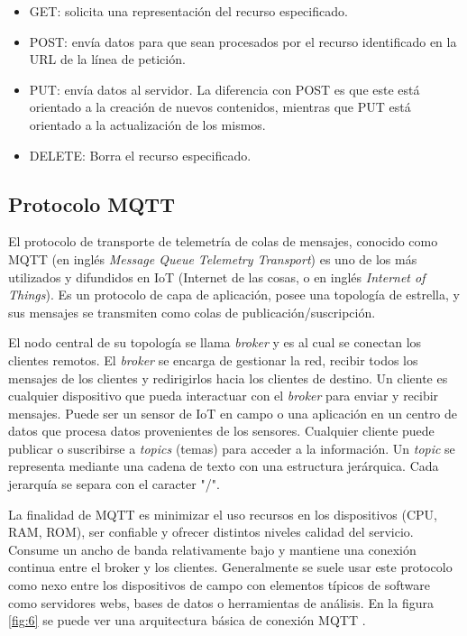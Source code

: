 \begin{itemize}
	\item GET: solicita una representación del recurso especificado.
	\item POST: envía datos para que sean procesados por el recurso identificado en la URL de la línea de petición.
	\item PUT: envía datos al servidor. La diferencia con POST es que este está orientado a la creación de nuevos contenidos, mientras que PUT está orientado a la actualización de los mismos.
	\item DELETE: Borra el recurso especificado.
\end{itemize}

\subsection{Protocolo MQTT}

El protocolo de transporte de telemetría de colas de mensajes, conocido como MQTT (en inglés \textit{Message Queue Telemetry Transport}) es uno de los más utilizados y difundidos en IoT (Internet de las cosas, o en inglés \textit{Internet of Things}). Es un protocolo de capa de aplicación, posee una topología de estrella, y sus mensajes se transmiten como colas de publicación/suscripción.

El nodo central de su topología se llama \textit{broker} y es al cual se conectan los clientes remotos. El \textit{broker} se encarga de gestionar la red, recibir todos los mensajes de los clientes y redirigirlos hacia los clientes de destino. Un cliente es cualquier dispositivo que pueda interactuar con el \textit{broker} para enviar y recibir mensajes. Puede ser un sensor de IoT en campo o una aplicación en un centro de datos que procesa datos provenientes de los sensores. Cualquier cliente puede publicar o suscribirse a \textit{topics} (temas) para acceder a la información. Un \textit{topic} se representa mediante una cadena de texto con una estructura jerárquica. Cada jerarquía se separa con el caracter "/".

La finalidad de MQTT es minimizar el uso recursos en los dispositivos (CPU, RAM, ROM), ser confiable y ofrecer distintos niveles calidad del servicio. Consume un ancho de banda relativamente bajo y mantiene una conexión continua entre el broker y los clientes. Generalmente se suele usar este protocolo como nexo entre los dispositivos de campo con elementos típicos de software como servidores webs, bases de datos o herramientas de análisis. En la figura \ref{fig:6} se puede ver una arquitectura básica de conexión MQTT \citep{10}.

